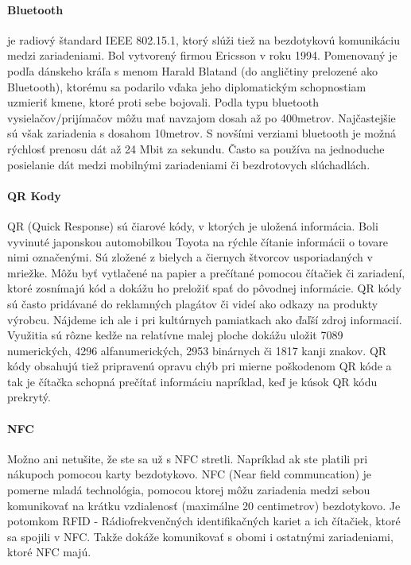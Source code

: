 \paragraph{Bluetooth} je radiový štandard IEEE 802.15.1, ktorý slúži tiež na bezdotykovú komunikáciu medzi zariadeniami. Bol vytvorený firmou Ericsson v roku 1994. Pomenovaný je podľa dánskeho kráľa s menom Harald Blatand (do angličtiny prelozené ako Bluetooth), ktorému sa podarilo vďaka jeho diplomatickým schopnostiam uzmieriť kmene, ktoré proti sebe bojovali. Podla typu bluetooth vysielačov/prijímačov môžu mať navzajom dosah až po 400metrov. Najčastejšie sú však zariadenia s dosahom 10metrov. S novšími verziami bluetooth je možná rýchlosť prenosu dát až 24 Mbit za sekundu. Často sa používa na jednoduche posielanie dát medzi mobilnými zariadeniami či bezdrotovych slúchadlách. 


\paragraph{QR Kody} QR (Quick Response) sú čiarové kódy, v ktorých je uložená informácia. Boli vyvinuté japonskou automobilkou Toyota na rýchle čítanie informácii o tovare nimi označenými. Sú zložené z bielych a čiernych štvorcov usporiadaných v mriežke. Môžu byť vytlačené na papier a prečítané pomocou čítačiek či zariadení, ktoré zosnímajú kód a dokážu ho preložiť spať do pôvodnej informácie.  QR kódy sú často pridávané do reklamných plagátov či videí ako odkazy na produkty výrobcu. Nájdeme ich ale i pri kultúrnych pamiatkach ako ďaľší zdroj informacií. Využitia sú rôzne kedže na relatívne malej ploche dokážu uložit 7089 numerických, 4296 alfanumerických, 2953 binárnych či 1817 kanji znakov\cite{qrcode-about}. QR kódy obsahujú tiež pripravenú opravu chýb pri mierne poškodenom QR kóde a tak je čítačka schopná prečítať informáciu napríklad, keď je kúsok QR kódu prekrytý\cite{qrcode-about}. 

\paragraph{NFC} Možno ani netušite, že ste sa už s NFC stretli. Napríklad ak ste platili pri nákupoch pomocou karty bezdotykovo. NFC (Near field communcation) je pomerne mladá technológia, pomocou ktorej môžu zariadenia medzi sebou komunikovať na krátku vzdialenosť (maximálne 20 centimetrov) bezdotykovo. Je potomkom RFID - Rádiofrekvenčných identifikačných kariet a ich čítačiek, ktoré sa spojili v NFC. Takže dokáže komunikovať s obomi i ostatnými zariadeniami, ktoré NFC majú.

